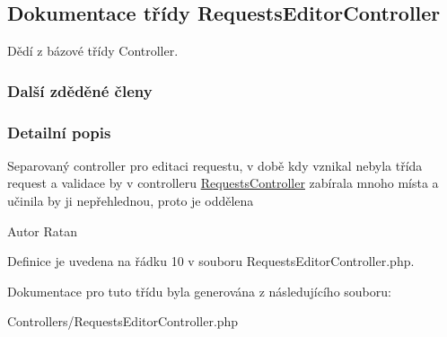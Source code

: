 \hypertarget{class_requests_editor_controller}{\subsection{Dokumentace třídy Requests\-Editor\-Controller}
\label{class_requests_editor_controller}
}


Dědí z bázové třídy Controller.

\subsubsection*{Další zděděné členy}


\subsubsection{Detailní popis}
Separovaný controller pro editaci requestu, v době kdy vznikal nebyla třída request a validace by v controlleru \hyperlink{class_requests_controller}{Requests\-Controller} zabírala mnoho místa a učinila by ji nepřehlednou, proto je oddělena \begin{DoxyAuthor}{Autor}
Ratan 
\end{DoxyAuthor}


Definice je uvedena na řádku 10 v souboru Requests\-Editor\-Controller.\-php.



Dokumentace pro tuto třídu byla generována z následujícího souboru\-:\begin{DoxyCompactItemize}
\item 
Controllers/Requests\-Editor\-Controller.\-php\end{DoxyCompactItemize}
